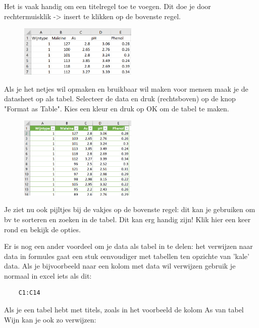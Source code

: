 Het is vaak handig om een titelregel toe te voegen. Dit doe je door rechtermuisklik -> insert te klikken op de bovenste regel.

\begin{figure}[h]
\begin{center}
\includegraphics[width=0.5\textwidth]{img/wijn2.png}
\end{center}
\end{figure}

Als je het netjes wil opmaken en bruikbaar wil maken voor mensen maak je de datasheet op als tabel. Selecteer de data en druk (rechtsboven) op de knop "Format as Table". Kies een kleur en druk op OK om de tabel te maken.
\begin{figure}[h]
\begin{center}
\includegraphics[width=0.5\textwidth]{img/wijn3.png}
\end{center}
\end{figure}

Je ziet nu ook pijltjes bij de vakjes op de bovenste regel: dit kan je gebruiken om bv te sorteren en zoeken in de tabel. Dit kan erg handig zijn! Klik hier een keer rond en bekijk de opties.

Er is nog een ander voordeel om je data als tabel in te delen: het verwijzen naar data in formules gaat een stuk eenvoudiger met tabellen ten opzichte van 'kale' data. Als je bijvoorbeeld naar een kolom met data wil verwijzen gebruik je normaal in excel iets als dit:
\begin{verbatim}
    C1:C14
\end{verbatim}

Als je een tabel hebt met titels, zoals in het voorbeeld de kolom As van tabel Wijn kan je ook zo verwijzen:

